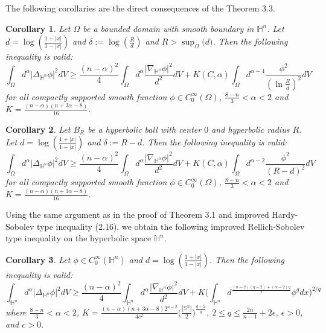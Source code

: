 \documentclass[12pt]{amsart}
\numberwithin{equation}{section}
\numberwithin{theorem}{section}
\numberwithin{theorem}{section} \numberwithin{lemma}{section}
\numberwithin{definition}{section}
\newtheorem{corollary}{Corollary}
\numberwithin{corollary}{section}
\numberwithin{remark}{section}
\numberwithin{proposition}{section}
\begin{document}
The following corollaries are the direct consequences of the Theorem
3.3.

\begin{corollary} Let $\Omega$ be a bounded domain with smooth boundary in $\mathbb{H}^n$.
 Let $d=\log(\frac{1+|x|}{1-|x|})$ and $\delta:=\log(\frac{R}{d})$ and $R> \sup_{\Omega}\big(d\big)$. Then the following inequality is valid:
\begin{equation}
\int_{\Omega}d^{\alpha}|\Delta_{\mathbb{H}^n}\phi|^2dV \ge
\frac{(n-\alpha)^2}{4}
\int_{\Omega}d^{\alpha}\frac{|\nabla_{\mathbb{H}^n}\phi|^2}{d^{2}}dV+K(C,
\alpha)\int_{\Omega}d^{\alpha-4}\frac{\phi^2}{(\ln\frac{R}{d})^2}dV
\end{equation}
for all compactly supported smooth function $\phi\in
C_0^{\infty}(\Omega)$, $\frac{8-n}{3}<\alpha<2$ and
$K=\frac{(n-\alpha)(n+3\alpha-8)}{16}$.
\end{corollary}
\medskip

\begin{corollary} Let $B_R$ be a hyperbolic ball with center $0$ and hyperbolic radius $R$.
 Let $d=\log(\frac{1+|x|}{1-|x|})$ and $\delta:=R-d$. Then the following inequality is valid:
\begin{equation}
\int_{\Omega}d^{\alpha}|\Delta_{\mathbb{H}^n}\phi|^2dV \ge
\frac{(n-\alpha)^2}{4}
\int_{\Omega}d^{\alpha}\frac{|\nabla_{\mathbb{H}^n}\phi|^2}{d^{2}}dV+K(C,
\alpha)\int_{\Omega}d^{\alpha-2}\frac{\phi^2}{(R-d)^2}dV
\end{equation}
for all compactly supported smooth function $\phi\in
C_0^{\infty}(\Omega)$, $\frac{8-n}{3}<\alpha<2$ and
$K=\frac{(n-\alpha)(n+3\alpha-8)}{16}$.
\end{corollary}

Using the same argument as in the proof of Theorem 3.1 and improved
Hardy-Sobolev type inequality (2.16), we obtain the following
improved Rellich-Sobolev type inequality on the hyperbolic space
$\mathbb{H}^n$.
\begin{corollary} Let  $\phi\in C_0^{\infty}(\mathbb{H}^n)$ and $d=\log
(\frac{1+|x|}{1-|x|})$. Then the following inequality is valid:
\begin{equation}
\int_{\mathbb{H}^n}d^{\alpha}|\Delta_{\mathbb{H}^n}\phi|^2dV \ge
\frac{(n-\alpha)^2}{4}
\int_{\mathbb{H}^n}d^{\alpha}\frac{|\nabla_{\mathbb{H}^n}\phi|^2}{d^{2}}dV+K\Big(\int_{
\mathbb{H}^n} d^{\frac{(n-2)(q-2)+(\alpha-2)
q}{2}}\phi^qdx\Big)^{2/q}
\end{equation}
where  $\frac{8-n}{3}<\alpha<2$,
$K=\frac{(n-\alpha)(n+3\alpha-8)2^{n-2}}{4c^2}\big(\frac{|\mathbb{S}^n|}{2}\big)^{\frac{q-2}{q}}
$, $2\le q\le \frac{2n}{n-1}+2\epsilon$, $\epsilon>0$, and $c>0$.
\end{corollary}
\end{document}
